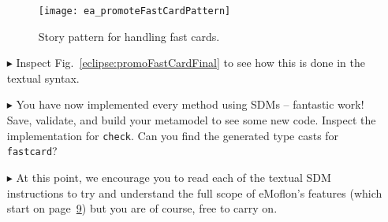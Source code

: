 \begin{itemize}
\begin{figure}[htbp]
\begin{center}
  \texttt{[image: ea\_promoteFastCardPattern]}
  \caption{Story pattern for handling fast cards.}  
  \label{ea:promoteFastCardPattern}
\end{center}
\end{figure}

\item[$\blacktriangleright$] Inspect Fig.~\ref{eclipse:promoFastCardFinal} to see how this is done in the textual syntax.

\item[$\blacktriangleright$] You have now implemented every method using SDMs -- fantastic work! Save, validate, and build your metamodel to see some new code.
Inspect the implementation for \texttt{check}.  Can you find the generated type casts for \texttt{fastcard}?

\item[$\blacktriangleright$] At this point, we encourage you to read each of the textual SDM instructions to try and understand the full scope of eMoflon's
features (which start on page~\hyperlink{page.9}{9}) but you are of course, free to carry on.


\end{itemize}
